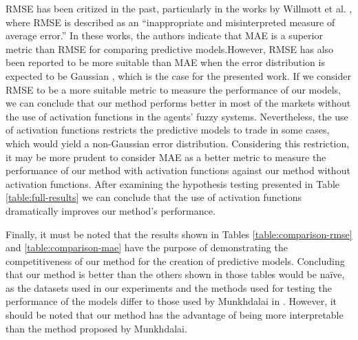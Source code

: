 \documentclass{ieeeaccess}
\begin{document}
RMSE has been critized in the past, particularly in the works by
Willmott et al. \cite{willmott2005advantages}
\cite{willmott2009ambiguities}, where RMSE is described as an
``inappropriate and misinterpreted measure of average error.'' In
these works, the authors indicate that MAE is a superior metric than
RMSE for comparing predictive models.However, RMSE has also been reported to be more suitable than MAE when the
error distribution is expected to be Gaussian \cite{chai2014root},
which is the case for the presented work. %
If we consider RMSE to be a
more suitable metric to measure the
performance of our models, we can conclude that our method performs
better in most of the markets without the use of activation functions
in the agents' fuzzy systems. Nevertheless, the use of activation
functions restricts the predictive models to trade in some cases,
which would yield a non-Gaussian error distribution. Considering this
restriction, it may be more prudent to consider MAE as a better metric
to measure the performance of our method with activation functions
against our method without activation functions. After examining the
hypothesis testing %
presented in Table \ref{table:full-results} we can
conclude that the use of activation functions dramatically improves
our method's performance. %


Finally, it must be noted that the results shown in
Tables \ref{table:comparison-rmse} and \ref{table:comparison-mae} have the
purpose of demonstrating the competitiveness of our method for the
creation of predictive models. Concluding that our method is better
than the others shown in those tables would be na\"ive, as the datasets
used in our experiments and the methods used for testing the
performance of the models differ to those used by Munkhdalai in
\cite{Munkhdalai2019}. However, it should be noted that our method has
the advantage of being more interpretable than the method proposed by
Munkhdalai.
\end{document}
